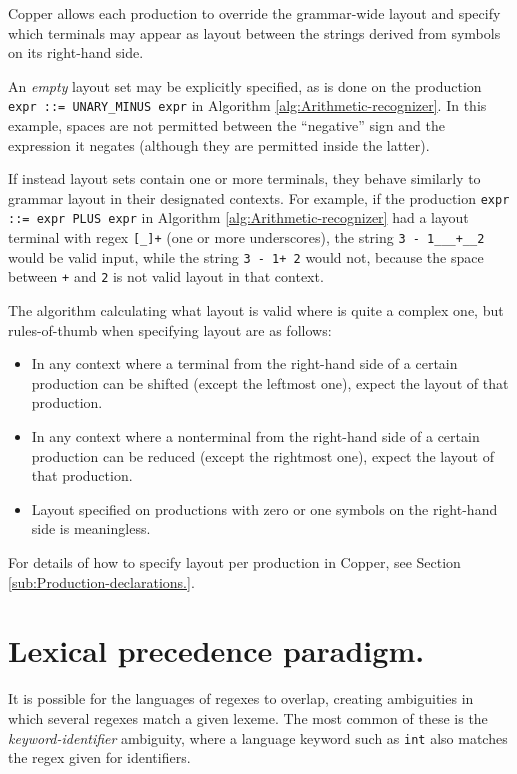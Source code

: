 \documentclass[12pt,english,twoside]{report}
\newcommand\sectionname{Section}
\begin{document}
Copper allows each production to override the grammar-wide layout
and specify which terminals may appear as layout between the strings
derived from symbols on its right-hand side.

An \emph{empty} layout set may be explicitly specified, as is done
on the production\\
 \texttt{expr~::=~UNARY\_MINUS~expr} in Algorithm \ref{alg:Arithmetic-recognizer}.
In this example, spaces are not permitted between the {}``negative''
sign and the expression it negates (although they are permitted inside
the latter).

If instead layout sets contain one or more terminals, they behave
similarly to grammar layout in their designated contexts. For example,
if the production \texttt{expr ::= expr PLUS expr} in Algorithm \ref{alg:Arithmetic-recognizer}
had a layout terminal with regex \texttt{{[}\_]+} (one or more underscores),
the string \texttt{3~-~1\_\_\_+\_\_2} would be valid input, while
the string \texttt{3~-~1+~2} would not, because the space between
\texttt{+} and \texttt{2} is not valid layout in that context.

The algorithm calculating what layout is valid where is quite a complex
one, but rules-of-thumb when specifying layout are as follows:

\begin{itemize}
\item In any context where a terminal from the right-hand side of a certain
production can be shifted (except the leftmost one), expect the layout
of that production.
\item In any context where a nonterminal from the right-hand side of a certain
production can be reduced (except the rightmost one), expect the layout
of that production.
\item Layout specified on productions with zero or one symbols on the right-hand
side is meaningless.
\end{itemize}
For details of how to specify layout per production in Copper, see
\sectionname{} \ref{sub:Production-declarations.}.


\section{\label{sec:Lexical-precedence-paradigm.}Lexical precedence paradigm.}

It is possible for the languages of regexes to overlap, creating ambiguities
in which several regexes match a given lexeme. The most common of
these is the \emph{keyword-identifier} ambiguity, where a language
keyword such as \texttt{int} also matches the regex given for identifiers.
\end{document}
